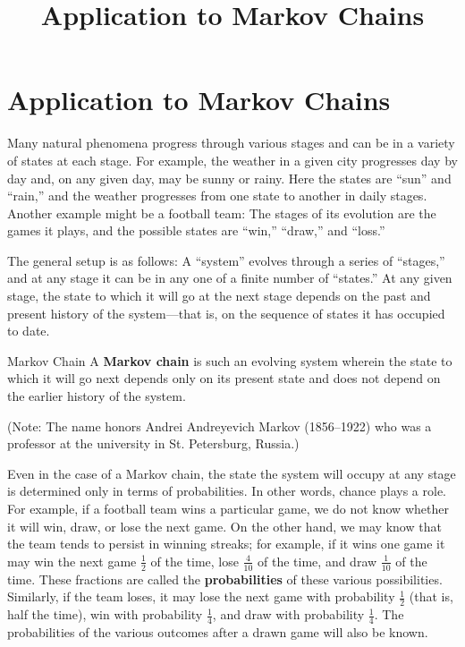 \documentclass{ximera}
\title{Application to Markov Chains} \license{CC BY-NC-SA 4.0}
\begin{document}
\begin{abstract}
\end{abstract}
\maketitle

\section*{Application to Markov Chains}
Many natural phenomena progress through various stages and can be in a variety of states at each stage. For example, the weather in a given city progresses day by day and, on any given day, may be sunny or rainy. Here the states are ``sun'' and ``rain,'' and the weather progresses from one state to another in daily stages. Another example might be a football team: The stages of its evolution are the games it plays, and the possible states are ``win,'' ``draw,'' and ``loss.''


The general setup is as follows: A ``system'' evolves through a series of ``stages,'' and at any stage it can be in any one of a finite number of ``states.'' At any given stage, the state to which it will go at the next stage depends on the past and present history of the system---that is, on the sequence of states it has occupied to date.


\begin{definition}{Markov Chain}\label{007191}
A \textbf{Markov chain} is such an evolving system wherein the state to which it will go next depends only on its present state and does not depend on the earlier history of the system.
\end{definition}

(Note: The name honors Andrei Andreyevich Markov (1856--1922) who was a professor at the university in St. Petersburg, Russia.)

Even in the case of a Markov chain, the state the system will occupy at any stage is determined only in terms of probabilities. In other words, chance plays a role. For example, if a football team wins a particular game, we do not know whether it will win, draw, or lose the next game. On the other hand, we may know that the team tends to persist in winning streaks; for example, if it wins one game it may win the next game $\frac{1}{2}$ of the time, lose $\frac{4}{10}$ of the time, and draw $\frac{1}{10}$ of the time. These fractions are called the \textbf{probabilities} of these various possibilities. Similarly, if the team loses, it may lose the next game with probability $\frac{1}{2}$ (that is, half the time), win with probability $\frac{1}{4}$, and draw with probability $\frac{1}{4}$. The probabilities of the various outcomes after a drawn game will also be known.
\end{document}
